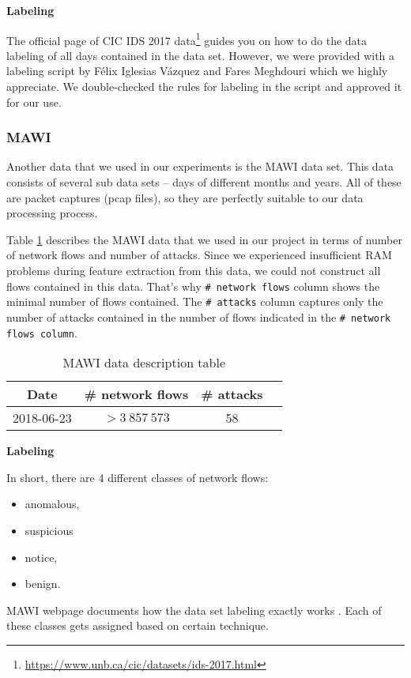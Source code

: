 \documentclass{article}
\begin{document}
\noindent\textbf{Labeling}

The official page of CIC IDS 2017 data\footnote{\url{https://www.unb.ca/cic/datasets/ids-2017.html}} guides you on how to do the data labeling of all days contained in the data set. However, we were provided with a labeling script by Félix Iglesias Vázquez and Fares Meghdouri which we highly appreciate. We double-checked the rules for labeling in the script and approved it for our use.


\subsubsection{MAWI}
Another data that we used in our experiments is the MAWI data set. This data consists of several sub data sets -- days of different months and years. All of these are packet captures (pcap files), so they are perfectly suitable to our data processing process.

Table \ref{tab:mawi-data-description} describes the MAWI data that we used in our project in terms of number of network flows and number of attacks. Since we experienced insufficient RAM problems during feature extraction from this data, we could not construct all flows contained in this data. That's why \verb|# network flows| column shows the minimal number of flows contained. The \verb|# attacks| column captures only the number of attacks contained in the number of flows indicated in the \verb|# network flows column|.

\begin{table}[h!]
\centering
    \begin{tabular}{ |c|c|c|c| }
        \hline
        Date & \# network flows & \# attacks \\
        \hline
        2018-06-23 & $>3\ 857\ 573$ & 58 \\
        \hline
    \end{tabular}
\caption{MAWI data description table}
\label{tab:mawi-data-description}
\end{table}



\noindent\textbf{Labeling}

In short, there are 4 different classes of network flows:

\begin{itemize}
    \item anomalous,
    \item suspicious
    \item notice,
    \item benign.
\end{itemize}
MAWI webpage documents how the data set labeling exactly works \cite{mawilab-documentation-labeling}. Each of these classes gets assigned based on certain technique.
\end{document}
